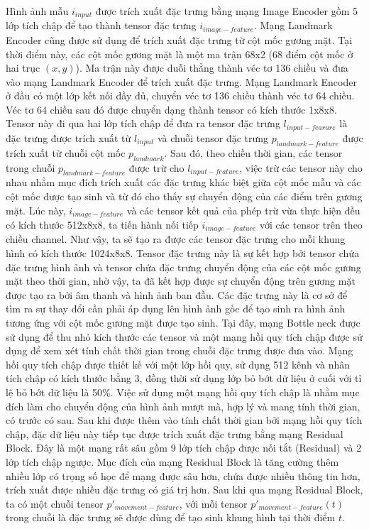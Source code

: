 Hình ảnh mẫu $i_{input}$ được trích xuất đặc trưng bằng mạng Image Encoder gồm 5 lớp tích chập để tạo thành tensor đặc trưng $i_{image-feature}$. Mạng Landmark Encoder cũng được sử dụng để trích xuất đặc trưng từ cột mốc gương mặt. Tại thời điểm này, các cột mốc gương mặt là một ma trận 68x2 (68 điểm cột mốc ở hai trục $(x,y)$). Ma trận này được duỗi thẳng thành véc tơ 136 chiều và đưa vào mạng Landmark Encoder để trích xuất đặc trưng. Mạng Landmark Encoder ở đầu có một lớp kết nối đầy đủ, chuyển véc tơ 136 chiều thành véc tơ 64 chiều. Véc tơ 64 chiều sau đó được chuyển dạng thành tensor có kích thước 1x8x8. Tensor này đi qua hai lớp tích chập để đưa ra tensor đặc trưng $l_{input-fearure}$ là đặc trưng được trích xuất từ $l_{input}$ và chuỗi tensor đặc trưng $p_{landmark-feature}$ được trích xuất từ chuỗi cột mốc $p_{landmark}$. Sau đó, theo chiều thời gian, các tensor trong chuỗi $p_{landmark-feature}$ được trừ cho $l_{input-feature}$, việc trừ các tensor này cho nhau nhằm mục đích trích xuất các đặc trưng khác biệt giữa cột mốc mẫu và các cột mốc được tạo sinh và từ đó cho thấy sự chuyển động của các điểm trên gương mặt. Lúc này, $i_{image-feature}$ và các tensor kết quả của phép trừ vừa thực hiện đều có kích thước 512x8x8, ta tiến hành nối tiếp $i_{image-feature}$ với các tensor trên theo chiều channel. Như vậy, ta sẽ tạo ra được các tensor đặc trưng cho mỗi khung hình có kích thước 1024x8x8. Tensor đặc trưng này là sự kết hợp bởi tensor chứa đặc trưng hình ảnh và tensor chứa đặc trưng chuyển động của các cột mốc gương mặt theo thời gian, nhờ vậy, ta đã kết hợp được sự chuyển động trên gương mặt được tạo ra bởi âm thanh và hình ảnh ban đầu. Các đặc trưng này là cơ sở để tìm ra sự thay đổi cần phải áp dụng lên hình ảnh gốc để tạo sinh ra hình ảnh tương ứng với cột mốc gương mặt được tạo sinh. Tại đây, mạng Bottle neck được sử dụng để thu nhỏ kích thước các tensor và một mạng hồi quy tích chập được sử dụng để xem xét tính chất thời gian trong chuỗi đặc trưng được đưa vào. Mạng hồi quy tích chập được thiết kế với một lớp hồi quy, sử dụng 512 kênh và nhân tích chập có kích thước bằng 3, đồng thời sử dụng lớp bỏ bớt dữ liệu ở cuối với tỉ lệ bỏ bớt dữ liệu là 50\%. Việc sử dụng một mạng hồi quy tích chập là nhằm mục đích làm cho chuyển động của hình ảnh mượt mà, hợp lý và mang tính thời gian, có trước có sau. Sau khi được thêm vào tính chất thời gian bởi mạng hồi quy tích chập, đặc dữ liệu này tiếp tục được trích xuất đặc trưng bằng mạng Residual Block. Đây là một mạng rất sâu gồm 9 lớp tích chập được nối tắt (Residual) và 2 lớp tích chập ngược. Mục đích của mạng Residual Block là tăng cường thêm nhiều lớp có trọng số học để mạng được sâu hơn, chứa được nhiều thông tin hơn, trích xuất được nhiều đặc trưng có giá trị hơn. Sau khi qua mạng Residual Block, ta có một chuỗi tensor $p'_{movement-feature}$, với mỗi tensor $p'_{movement-feature}(t)$ trong chuỗi là đặc trưng sẽ được dùng để tạo sinh khung hình tại thời điểm $t$.

